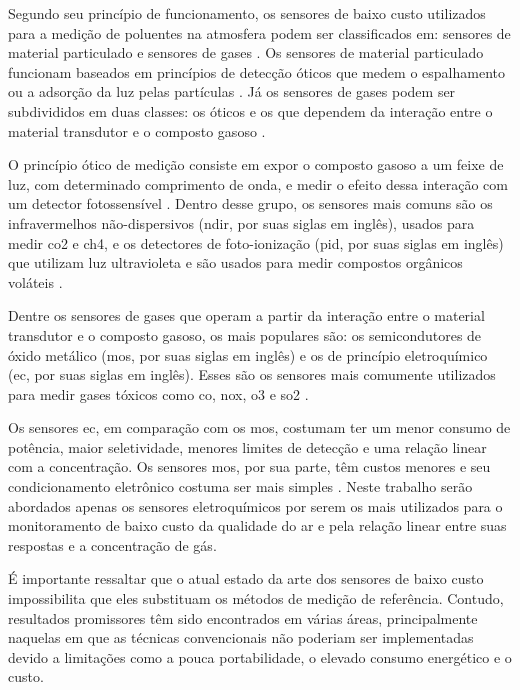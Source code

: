Segundo seu princípio de funcionamento, os sensores de baixo custo utilizados para a medição de poluentes na atmosfera podem ser classificados em: sensores de material particulado e sensores de gases \cite{Maag2018ADeployments}. Os sensores de material particulado funcionam baseados em princípios  de detecção óticos que medem o espalhamento ou a adsorção da luz pelas partículas \cite{Rai2017End-userMonitoring}. Já os sensores de gases podem ser subdivididos em duas classes: os óticos e os que dependem da interação entre o material transdutor e o composto gasoso \cite{Snyder2013}.
	
O princípio ótico de medição consiste em expor o composto gasoso a um feixe de luz, com determinado comprimento de onda, e medir o efeito dessa interação com um detector fotossensível \cite{Rai2017End-userMonitoring}. Dentro desse grupo, os sensores mais comuns são os infravermelhos não-dispersivos (\gls{ndir}, por suas siglas em inglês), usados para medir \acrshort{co2} e \acrshort{ch4}, e os detectores de foto-ionização (\gls{pid}, por suas siglas em inglês) que utilizam luz ultravioleta e são usados para medir compostos orgânicos voláteis \cite{Snyder2013}.

Dentre os sensores de gases que operam a partir da interação entre o material transdutor e o composto gasoso, os mais populares são: os semicondutores de óxido metálico (\gls{mos}, por suas siglas em inglês) e os de princípio eletroquímico (\gls{ec}, por suas siglas em inglês). Esses são os sensores mais comumente utilizados para medir gases tóxicos como \acrshort{co}, \acrshort{nox}, \acrshort{o3} e \acrshort{so2} \cite{Lewis2018Low-costApplications}.

Os sensores \gls{ec}, em comparação com os \gls{mos}, costumam ter um menor consumo de potência, maior seletividade, menores limites de detecção e uma relação linear com a concentração. Os sensores \gls{mos}, por sua parte, têm custos menores e seu condicionamento eletrônico costuma ser mais simples \cite{Rai2017End-userMonitoring}. Neste trabalho serão abordados apenas os sensores eletroquímicos por serem os mais utilizados para o monitoramento de baixo custo da qualidade do ar e pela relação linear entre suas respostas e a concentração de gás.

É importante ressaltar que o atual estado da arte dos sensores de baixo custo impossibilita que eles substituam os métodos de medição de referência. Contudo, resultados promissores têm sido encontrados em várias áreas, principalmente naquelas em que as técnicas convencionais não poderiam ser implementadas devido a limitações como a pouca portabilidade, o elevado consumo energético e o custo. 

